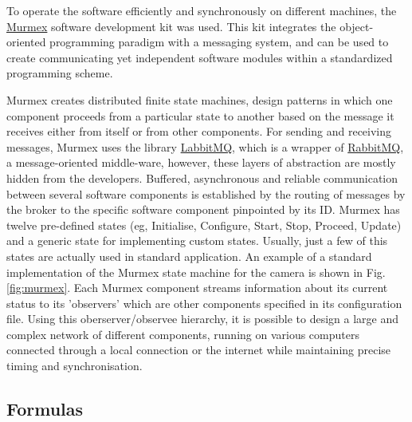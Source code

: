 \documentclass[12pt]{spieman}  %
\begin{document}
To operate the software efficiently and synchronously on different machines, the \href{http://sine.ni.com/nips/cds/view/p/lang/en/nid/212895}{Murmex} software development kit was used. This kit integrates the object-oriented programming paradigm with a messaging system, and can be used to create communicating yet independent software modules within a standardized programming scheme.

Murmex creates distributed finite state machines, design patterns in which one component proceeds from a particular state to another based on the message it receives either from itself or from other components. For sending and receiving messages, Murmex uses the library \href{http://sine.ni.com/nips/cds/view/p/lang/en/nid/211065}{LabbitMQ}, which is a wrapper of \href{http://www.rabbitmq.com/}{RabbitMQ}, a message-oriented middle-ware, however, these layers of abstraction are mostly hidden from the developers. %
Buffered, asynchronous and reliable communication between several software components is established by the routing of messages by the broker to the specific software component pinpointed by its ID. %
Murmex has twelve pre-defined states (eg, Initialise, Configure, Start, Stop, Proceed, Update) and a generic state for implementing custom states. Usually, just a few of this states are actually used in standard application. An example of a standard implementation of the Murmex state machine for the camera is shown in Fig. \ref{fig:murmex}. Each Murmex component streams information about its current status to its 'observers' which are other components specified in its configuration file. Using this oberserver/observee hierarchy, it is possible to design a large and complex network of different components, running on various computers connected through a local connection or the internet while maintaining precise timing and synchronisation. %



\subsection{Formulas}
\end{document}
